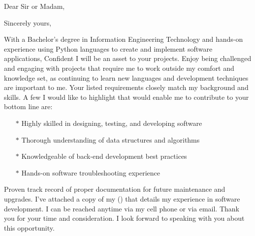 \documentclass{subfiles}
\begin{document}
\clearpage
{} %
\date{\today} %
\opening{Dear Sir or Madam,} %
\closing{Sincerely yours,} %

\makelettertitle %
With a Bachelor’s degree in Information Engineering Technology and hands-on experience using Python languages to create and implement software applications, Confident I will be an asset to your projects.
\newline
Enjoy being challenged and engaging with projects that require me to work outside my comfort and knowledge set, as continuing to learn new languages and development techniques are important to me.
\newline
Your listed requirements closely match my background and skills. A few I would like to highlight that would enable me to contribute to your bottom line are:

\begin{itemize}
        \item[$\ast$] Highly skilled in designing, testing, and developing software
        \item[$\ast$] Thorough understanding of data structures and algorithms
        \item[$\ast$] Knowledgeable of back-end development best practices
        \item[$\ast$] Hands-on software troubleshooting experience
\end{itemize}

Proven track record of proper documentation for future maintenance and upgrades.
I’ve attached a copy of my  () that details my experience in software development. I can be reached anytime via my cell phone or via email.
\newline
Thank you for your time and consideration. I look forward to speaking with you about this opportunity.

\makeletterclosing %

\newpage
\end{document}
